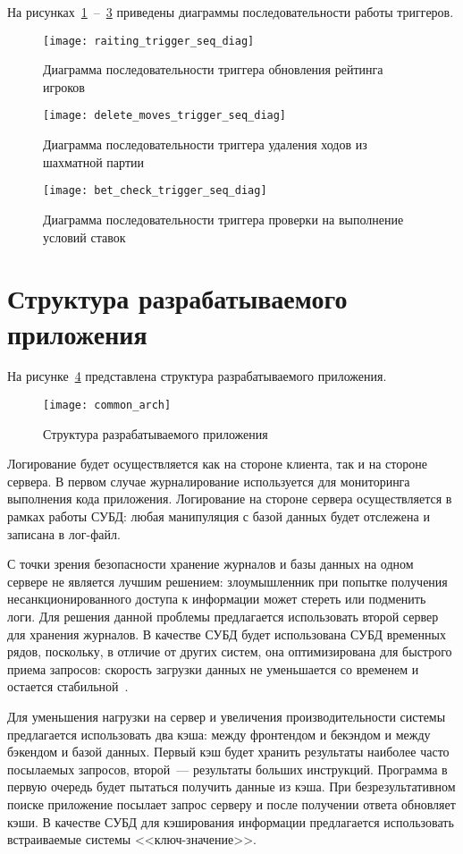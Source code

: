 На рисунках~\ref{raiting_trigger_seq_diag}~--~\ref{bet_check_trigger_seq_diag} приведены диаграммы последовательности работы триггеров.
\begin{figure}[H]
	\centering
	\texttt{[image: raiting\_trigger\_seq\_diag]}
	\caption{Диаграмма последовательности триггера обновления рейтинга игроков}
	\label{raiting_trigger_seq_diag}
\end{figure}
\begin{figure}[H]
	\centering
	\texttt{[image: delete\_moves\_trigger\_seq\_diag]}
	\caption{Диаграмма последовательности триггера удаления ходов из шахматной партии}
	\label{delete_moves_trigger_seq_diag}
\end{figure}
\begin{figure}[H]
	\centering
	\texttt{[image: bet\_check\_trigger\_seq\_diag]}
	\caption{Диаграмма последовательности триггера проверки на выполнение условий ставок}
	\label{bet_check_trigger_seq_diag}
\end{figure}

\section{Структура разрабатываемого приложения}

На рисунке~\ref{common_arch} представлена структура разрабатываемого приложения.
\begin{figure}[H]
	\centering
	\texttt{[image: common\_arch]}
	\caption{Структура разрабатываемого приложения}
	\label{common_arch}
\end{figure}

Логирование будет осуществляется как на стороне клиента, так и на стороне сервера. В первом случае журналирование используется для мониторинга выполнения кода приложения.
Логирование на стороне сервера осуществляется в рамках работы СУБД: любая манипуляция с базой данных будет отслежена и записана в лог-файл.

С точки зрения безопасности хранение журналов и базы данных на одном сервере не является лучшим решением: злоумышленник при попытке получения несанкционированного доступа к информации может стереть или подменить логи.
Для решения данной проблемы предлагается использовать второй сервер для хранения журналов.
В качестве СУБД будет использована СУБД временных рядов, поскольку, в отличие от других систем, она оптимизирована для быстрого приема запросов: скорость загрузки данных не уменьшается со временем и остается стабильной~\cite{timedb}.

Для уменьшения нагрузки на сервер и увеличения производительности системы предлагается использовать два кэша: между фронтендом и бекэндом и между бэкендом и базой данных. Первый кэш будет хранить результаты наиболее часто посылаемых запросов, второй~--- результаты больших инструкций. Программа в первую очередь будет пытаться получить данные из кэша. При безрезультативном поиске приложение посылает запрос серверу и после получении ответа обновляет кэши. В качестве СУБД для кэширования информации предлагается использовать встраиваемые системы <<ключ-значение>>.

\clearpage
